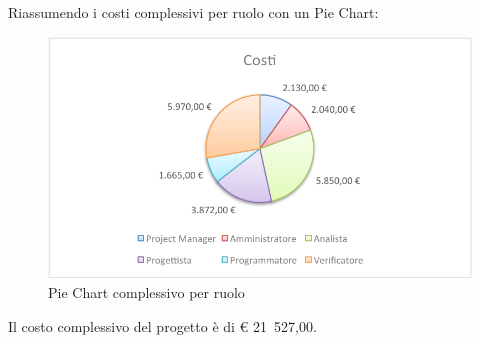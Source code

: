 				Riassumendo i costi complessivi per ruolo con un Pie Chart:
				\begin{figure}[H]\centering
					\includegraphics[width=\textwidth]{PianoDiProgetto/Pics/ChartTotCosti.pdf}
					\caption{Pie Chart complessivo per ruolo}
				\end{figure}
				Il costo complessivo del progetto è di \euro{} 21~527,00.